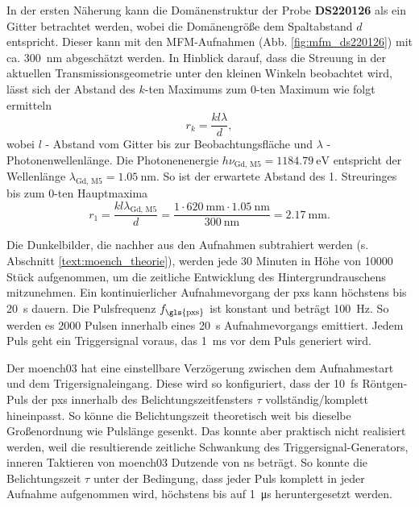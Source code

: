 \noindent
In der ersten Näherung kann die Domänenstruktur der Probe \textbf{DS220126} als ein Gitter betrachtet werden, wobei die Domänengröße dem Spaltabstand $d$ entspricht. Dieser kann mit den MFM-Aufnahmen (Abb. \ref{fig:mfm_ds220126}) mit ca. \SI{300}{\nano\meter} abgeschätzt werden. In Hinblick darauf, dass die Streuung in der aktuellen Transmissionsgeometrie unter den kleinen Winkeln beobachtet wird, lässt sich der Abstand des $k$-ten Maximums zum $0$-ten Maximum wie folgt ermitteln
\begin{equation}
     r_{k} = \frac{kl\lambda}{d},
 \end{equation}
 wobei $l$ - Abstand vom Gitter bis zur Beobachtungsfläche und $\lambda$ - Photonenwellenlänge. Die Photonenenergie $h\nu_{\text{Gd, M5}} = \SI{1184,79}{\eV}$ entspricht der Wellenlänge $\lambda_{\text{Gd, M5}} = \SI{1,05}{\nano\meter}$. So ist der erwartete Abstand des 1. Streuringes bis zum $0$-ten Hauptmaxima 
 \begin{equation}
     r_{1} = \frac{kl\lambda_{\text{Gd, M5}}}{d} = \frac{1\cdot\SI{620}{\milli\meter}\cdot\SI{1,05}{\nano\meter}}{\SI{300}{\nano\meter}} = \SI{2.17}{\milli\meter}.
 \end{equation}

\noindent
Die Dunkelbilder, die nachher aus den Aufnahmen subtrahiert werden (s. Abschnitt \ref{text:moench_theorie}), werden jede 30 Minuten in Höhe von \num{10000} Stück aufgenommen, um die zeitliche Entwicklung des Hintergrundrauschens mitzunehmen. Ein kontinuierlicher Aufnahmevorgang der \gls{pxs} kann höchstens bis \SI{20}{\second} dauern. Die Pulsfrequenz $f_\text{\gls{pxs}}$ ist konstant und beträgt \SI{100}{\hertz}. So werden es \num{2000} Pulsen innerhalb eines \SI{20}{\second} Aufnahmevorgangs emittiert. Jedem Puls geht ein Triggersignal voraus, das \SI{1}{\milli\second} vor dem Puls generiert wird.

\noindent
Der \gls{moench03} hat eine einstellbare Verzögerung zwischen dem Aufnahmestart und dem Trigersignaleingang. Diese wird so konfiguriert, dass der \SI{10}{\femto\second} Röntgen-Puls der \gls{pxs} innerhalb des Belichtungszeitfensters $\tau$ vollständig/komplett hineinpasst. So könne die Belichtungszeit theoretisch weit bis dieselbe Großenordnung wie Pulslänge gesenkt. Das konnte aber praktisch nicht realisiert werden, weil die resultierende zeitliche Schwankung des Triggersignal-Generators, inneren Taktieren von \gls{moench03} Dutzende von \si{\nano\second} beträgt. So konnte die Belichtungszeit $\tau$ unter der Bedingung, dass jeder Puls komplett in jeder Aufnahme aufgenommen wird, höchstens bis auf \SI{1}{\micro\second} heruntergesetzt werden.

